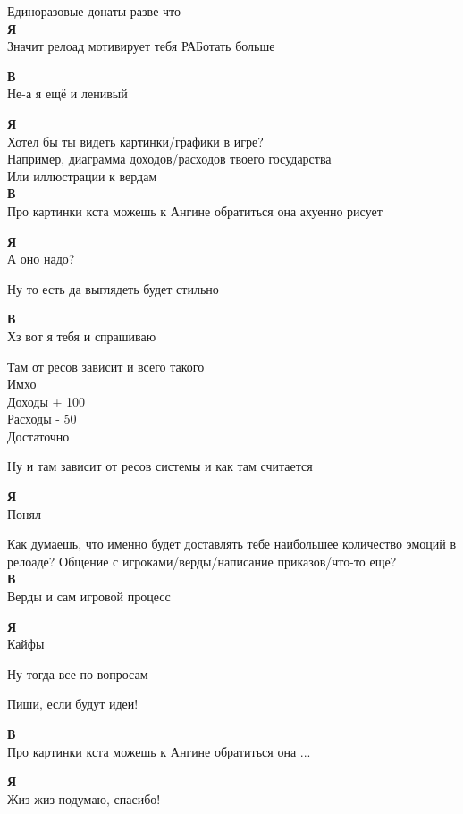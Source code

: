 Единоразовые донаты разве что\\

\textbf{Я} \\
Значит релоад мотивирует тебя РАБотать больше

\textbf{В} \\
Не-а я ещё и ленивый

\textbf{Я} \\
Хотел бы ты видеть картинки/графики в игре?\\

Например, диаграмма доходов/расходов твоего государства\\

Или иллюстрации к вердам\\

\textbf{В} \\
Про картинки кста можешь к Ангине обратиться она ахуенно рисует

\textbf{Я} \\
А оно надо?

Ну то есть да выглядеть будет стильно

\textbf{В} \\
Хз вот я тебя и спрашиваю

Там от ресов зависит и всего такого\\

Имхо \\
Доходы + 100 \\
Расходы - 50 \\
Достаточно

Ну и там зависит от ресов системы и как там считается

\textbf{Я} \\
Понял

Как думаешь, что именно будет доставлять тебе наибольшее количество эмоций в релоаде? Общение с игроками/верды/написание приказов/что-то еще?\\

\textbf{В} \\
Верды и сам игровой процесс

\textbf{Я} \\
Кайфы

Ну тогда все по вопросам

Пиши, если будут идеи!

\textbf{В} \\
Про картинки кста можешь к Ангине обратиться она ...

\textbf{Я} \\
Жиз жиз подумаю, спасибо!